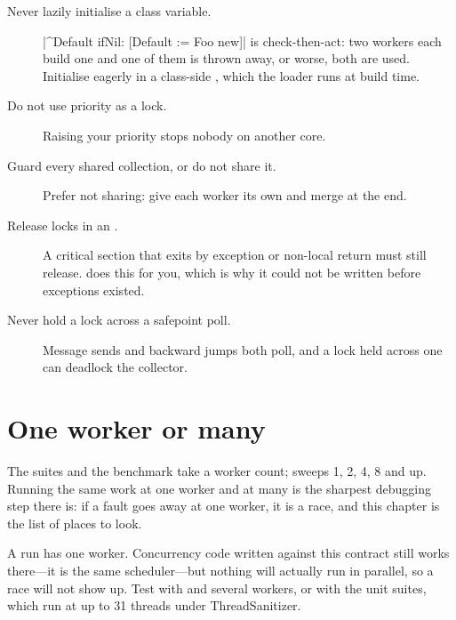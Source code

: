 \begin{description}
\item[Never lazily initialise a class variable.]
  \ct|^Default ifNil: [Default := Foo new]| is check-then-act: two workers
  each build one and one of them is thrown away, or worse, both are used.
  Initialise eagerly in a class-side , which the loader runs at
  build time.
\item[Do not use priority as a lock.] Raising your priority stops nobody on
  another core.
\item[Guard every shared collection, or do not share it.] Prefer not sharing:
  give each worker its own and merge at the end.
\item[Release locks in an .] A critical section that exits by
  exception or non-local return must still release.  does this for
  you, which is why it could not be written before exceptions existed.
\item[Never hold a lock across a safepoint poll.] Message sends and backward
  jumps both poll, and a lock held across one can deadlock the collector.
\end{description}

\section{One worker or many}

The suites and the benchmark take a worker count;  sweeps 1, 2,
4, 8 and up. Running the same work at one worker and at many is the sharpest
debugging step there is: if a fault goes away at one worker, it is a race, and
this chapter is the list of places to look.

\begin{stnote}
A  run has one worker. Concurrency code written against
this contract still works there---it is the same scheduler---but nothing will
actually run in parallel, so a race will not show up. Test with  and
several workers, or with the unit suites, which run at up to 31 threads under
ThreadSanitizer.
\end{stnote}
